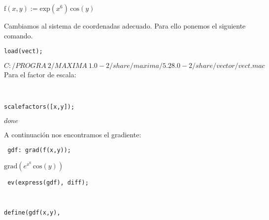 \documentclass[12pt]{article}
\begin{document}
\begin{math}
\mathrm{f}\left( x,y\right) :=\mathrm{exp}\left( {x}^{6}\right) \,\mathrm{cos}\left( y\right) 
\end{math}


Cambiamos al sistema de coordenadas adecuado. Para ello ponemos el siguiente comando.

\noindent

\begin{verbatim}
load(vect);
\end{verbatim}


\begin{math}
C:/PROGRA~2/MAXIMA~1.0-2/share/maxima/5.28.0-2/share/vector/vect.mac
\end{math}
Para el factor de escala:

\noindent
\
\begin{verbatim}
scalefactors([x,y]);
\end{verbatim}


\begin{math}
done
\end{math}

A continuación nos encontramos el gradiente:

\noindent

\begin{verbatim}
 gdf: grad(f(x,y));
\end{verbatim}


\begin{math}
\mathrm{grad}\left( {e}^{{x}^{6}}\,\mathrm{cos}\left( y\right) \right) 
\end{math}

 
\noindent
\begin{verbatim}
 ev(express(gdf), diff);
\end{verbatim}


\begin{math}
[6\,{x}^{5}\,{e}^{{x}^{6}}\,\mathrm{cos}\left( y\right) ,-{e}^{{x}^{6}}\,\mathrm{sin}\left( y\right) ]
\end{math}


\noindent
\begin{verbatim}

define(gdf(x,y), 
\end{verbatim}
\end{document}
